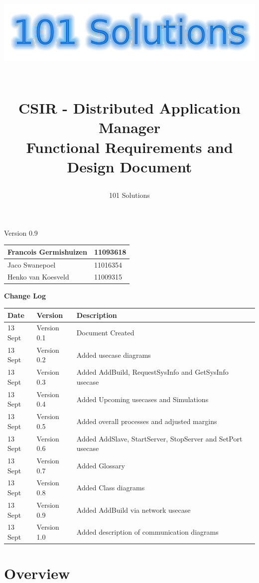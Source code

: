 \documentclass[a4paper,12pt,final]{article}
\title{
\begin{center}
  	\includegraphics[scale=0.3]{101Logo.png} 
  \end{center}
  \textbf{\\}
CSIR - Distributed Application Manager\\
Functional Requirements and Design Document\\
}
\author{101 Solutions}
\begin{document}
\maketitle
\begin{center}
Version 0.9
\end{center}
\vfill
\begin{center}
\begin{tabular}{|l|l|}
\hline
Francois Germishuizen & 11093618\\
\hline
Jaco Swanepoel & 11016354\\
\hline
Henko van Koesveld & 11009315\\
\hline
\end{tabular}
\end{center}
\thispagestyle{empty}
\newpage
\thispagestyle{empty}
\textbf{\large{Change Log}}
\vspace{6pt}\newline
\begin{tabular}{|l|l|l|}
\hline
Date & Version & Description\\
\hline
13 Sept & Version 0.1 & Document Created\\
\hline
13 Sept & Version 0.2 & Added usecase diagrams\\
\hline
13 Sept & Version 0.3 & Added AddBuild, RequestSysInfo and GetSysInfo usecase\\
\hline
13 Sept & Version 0.4 & Added Upcoming usecases and Simulations\\
\hline
13 Sept & Version 0.5 & Added overall processes and adjusted margins\\
\hline
13 Sept & Version 0.6 & Added AddSlave, StartServer, StopServer and SetPort usecase\\
\hline
13 Sept & Version 0.7 & Added Glossary\\
\hline
13 Sept & Version 0.8 & Added Class diagrams\\
\hline
13 Sept & Version 0.9 & Added AddBuild via network usecase\\
\hline
13 Sept & Version 1.0 & Added description of communication diagrams\\
\hline
\end{tabular}
\newpage
\tableofcontents
\thispagestyle{empty}
\newpage

\section{Overview}
\end{document}
